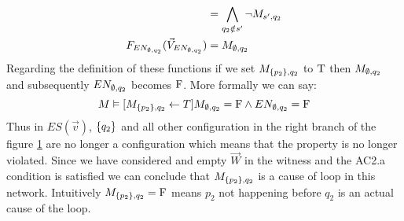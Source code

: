 \begin{example}
\begin{align*}
                        & =  \bigwedge_{q_2 \notin s'}
        \neg M_{s',q_2}                                \\
        F_{EN_{\emptyset,q_2}}(\vec V_{EN_{\emptyset,q_2}}) & = M_{\emptyset,q_2}
    \end{align*}
    Regarding the definition of these functions if we set $M_{\{p_2\},q_2}$
    to $\mathrm{T}$ then $M_{\emptyset,q_2}$ and subsequently $EN_{\emptyset,q_2}$ becomes $\mathrm{F}$.
    More formally we can say:
    \begin{equation*}
        M \vDash [M_{\{p_2\},q_2} \leftarrow T] M_{\emptyset,q_2} = \mathrm{F} \wedge
        EN_{\emptyset,q_2} = \mathrm{F}
    \end{equation*}
    Thus in $ES(\vec v)$, $\{q_2\}$ and all other configuration in the
    right branch of the figure \ref{fig:loop:es} are no longer a
    configuration which means that the property is no longer violated.
    Since we have considered and empty $\vec W$ in the witness and
    the AC2.a condition is satisfied we can conclude that $M_{\{p_2\},q_2}$
    is a cause of loop in this network.
    Intuitively $M_{\{p_2\},q_2} = \mathrm{F}$ means $p_2$ not happening before
    $q_2$ is an actual cause of the loop.

    \begin{figure}
        \centering
        \caption{}
        \label{fig:loop:es}
    \end{figure}

\end{example}
